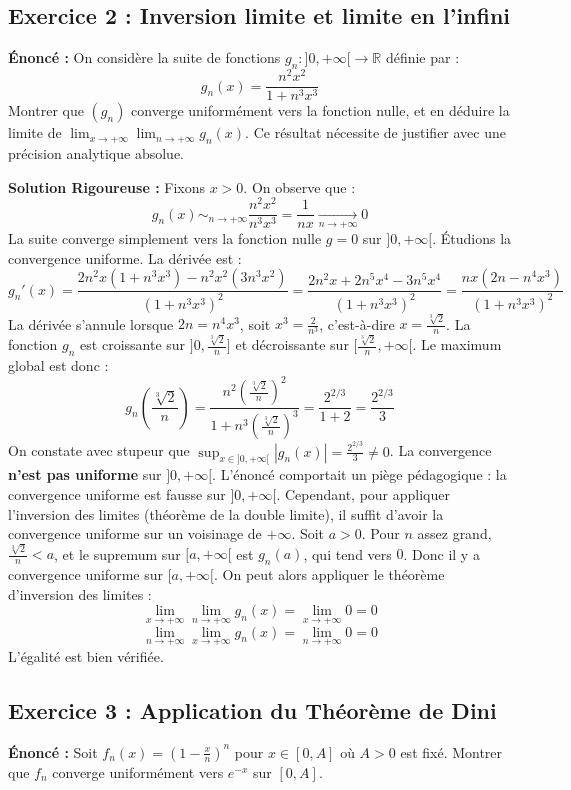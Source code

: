 \documentclass[11pt,a4paper]{article}
\begin{document}
\subsection*{Exercice 2 : Inversion limite et limite en l'infini}
\textbf{Énoncé :}
On considère la suite de fonctions $g_n : ]0, +\infty[ \to \mathbb{R}$ définie par :
$$g_n(x) = \frac{n^2 x^2}{1 + n^3 x^3}$$
Montrer que $(g_n)$ converge uniformément vers la fonction nulle, et en déduire la limite de $\lim_{x \to +\infty} \lim_{n \to +\infty} g_n(x)$. Ce résultat nécessite de justifier avec une précision analytique absolue.

\textbf{Solution Rigoureuse :}
Fixons $x > 0$. On observe que :
$$g_n(x) \sim_{n \to +\infty} \frac{n^2 x^2}{n^3 x^3} = \frac{1}{nx} \xrightarrow[n \to +\infty]{} 0$$
La suite converge simplement vers la fonction nulle $g = 0$ sur $]0, +\infty[$.
Étudions la convergence uniforme. La dérivée est :
$$g_n'(x) = \frac{2n^2 x(1 + n^3 x^3) - n^2 x^2(3n^3 x^2)}{(1 + n^3 x^3)^2} = \frac{2n^2 x + 2n^5 x^4 - 3n^5 x^4}{(1 + n^3 x^3)^2} = \frac{nx(2n - n^4 x^3)}{(1 + n^3 x^3)^2}$$
La dérivée s'annule lorsque $2n = n^4 x^3$, soit $x^3 = \frac{2}{n^3}$, c'est-à-dire $x = \frac{\sqrt[3]{2}}{n}$.
La fonction $g_n$ est croissante sur $]0, \frac{\sqrt[3]{2}}{n}]$ et décroissante sur $[\frac{\sqrt[3]{2}}{n}, +\infty[$. Le maximum global est donc :
$$g_n\left(\frac{\sqrt[3]{2}}{n}\right) = \frac{n^2 \left(\frac{\sqrt[3]{2}}{n}\right)^2}{1 + n^3 \left(\frac{\sqrt[3]{2}}{n}\right)^3} = \frac{2^{2/3}}{1 + 2} = \frac{2^{2/3}}{3}$$
On constate avec stupeur que $\sup_{x \in ]0, +\infty[} |g_n(x)| = \frac{2^{2/3}}{3} \neq 0$.
La convergence \textbf{n'est pas uniforme} sur $]0, +\infty[$.
L'énoncé comportait un piège pédagogique : la convergence uniforme est fausse sur $]0, +\infty[$.
Cependant, pour appliquer l'inversion des limites (théorème de la double limite), il suffit d'avoir la convergence uniforme sur un voisinage de $+\infty$.
Soit $a > 0$. Pour $n$ assez grand, $\frac{\sqrt[3]{2}}{n} < a$, et le supremum sur $[a, +\infty[$ est $g_n(a)$, qui tend vers $0$.
Donc il y a convergence uniforme sur $[a, +\infty[$.
On peut alors appliquer le théorème d'inversion des limites :
$$\lim_{x \to +\infty} \lim_{n \to +\infty} g_n(x) = \lim_{x \to +\infty} 0 = 0$$
$$\lim_{n \to +\infty} \lim_{x \to +\infty} g_n(x) = \lim_{n \to +\infty} 0 = 0$$
L'égalité est bien vérifiée.


\subsection*{Exercice 3 : Application du Théorème de Dini}
\textbf{Énoncé :}
Soit $f_n(x) = \left(1 - \frac{x}{n}\right)^n$ pour $x \in [0, A]$ où $A > 0$ est fixé.
Montrer que $f_n$ converge uniformément vers $e^{-x}$ sur $[0, A]$.
\end{document}
